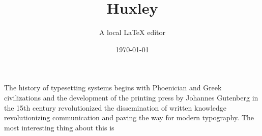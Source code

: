 \documentclass[11pt]{article}
\title{Huxley}
\author{A local LaTeX editor}
\date{\today}
\begin{document}
\maketitle




The history of typesetting systems begins with Phoenician and Greek civilizations and the development of the printing press by Johannes Gutenberg in the 15th century revolutionized the dissemination of written knowledge revolutionizing communication and paving the way for modern typography. The most interesting thing about this is 
\end{document}
